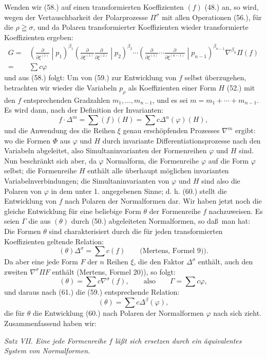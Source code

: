 Wenden wir (58.) auf einen transformierten Koeffizienten $(f)$ (48.) an, so wird, wegen der Vertauschbarkeit der Polarprozesse $\Pi^\sigma$ mit allen Operationen (56.), f\"ur die $\rho\geqq\sigma$, und da Polaren transformierter Koeffizienten wieder transformierte Koeffizienten ergeben:
\[
\begin{aligned}
 G={}&\left(\frac{\partial}{\partial\xi^{(1)}}\middle|p_1\right)^{\beta_1}
 \left(\frac{\partial}{\partial\xi^{(1)}}\frac{\partial}{\partial\xi^{(2)}}\middle|p_2\right)^{\beta_2}
 \cdots
 \left(\frac{\partial}{\partial\xi^{(1)}}\cdots\frac{\partial}{\partial\xi^{(n-1)}}\middle|p_{n-1}\right)^{\beta_{n-1}}
 \nabla^{\beta_n}\Pi(f)\\
 ={}&\sum c\varphi
\end{aligned}
\]
und aus (58.) folgt:
Um von (59.) zur Entwicklung von $f$ selbst \"uberzugehen, betrachten wir wieder die Variabeln $p_\rho$ als Koeffizienten einer Form $H$ (52.) mit den $f$ entsprechenden Gradzahlen $m_1,\ldots,m_{n-1}$, und es sei $m=m_1+\cdots+m_{n-1}$. Es wird dann, nach der Definition der Invarianten:
\[
 f\cdot\Delta^m=\sum(f)(H)=\sum c\Delta^\alpha(\varphi)(H),
\]
und die Anwendung des die Reihen $\xi$ genau ersch\"opfenden Prozesses $\nabla^m$ ergibt:
wo die Formen $\Phi$ aus $\varphi$ und $H$ durch invariante Differentiationsprozesse nach den Variabeln abgeleitet, also Simultaninvarianten der Formenreihen $\varphi$ und $H$ sind. Nun beschr\"ankt sich aber, da $\varphi$ Normalform, die Formenreihe $\varphi$ auf die Form $\varphi$ selbst; die Formenreihe $H$ enth\"alt alle \"uberhaupt m\"oglichen invarianten Variabelnverbindungen; die Simultaninvarianten von $\varphi$ und $H$ sind also die Polaren von $\varphi$ in dem unter 1. angegebenen Sinne; d. h. (60.) stellt die Entwicklung von $f$ nach Polaren der Normalformen dar. Wir haben jetzt noch die gleiche Entwicklung f\"ur eine beliebige Form $\theta$ der Formenreihe $f$ nachzuweisen. Es seien $\Gamma$ die aus $(\theta)$ durch (50.) abgeleiteten Normalformen, so da\ss\ man hat:
Die Formen $\theta$ sind charakterisiert durch die f\"ur jeden transformierten Koeffizienten geltende Relation:
\[
 (\theta)\Delta^\sigma=\sum c(f)\qquad\text{(Mertens, Formel 9)).}
\]
Da aber eine jede Form $F$ der $n$ Reihen $\xi$, die den Faktor $\Delta^\sigma$ enth\"alt, auch den zweiten $\nabla^\sigma\Pi F$ enth\"alt (Mertens, Formel 20)), so folgt:
\[
 (\theta)=\sum c\nabla^\sigma(f),\qquad\text{also}\qquad \Gamma=\sum c\varphi,
\]
und daraus nach (61.) die (59.) entsprechende Relation:
\[
 (\theta)=\sum c\Delta^\beta(\varphi),
\]
die f\"ur $\theta$ die Entwicklung (60.) nach Polaren der Normalformen $\varphi$ nach sich zieht. Zusammenfassend haben wir:

\emph{Satz VII. Eine jede Formenreihe $f$ l\"a\ss t sich ersetzen durch ein \"aquivalentes System von Normalformen.}

